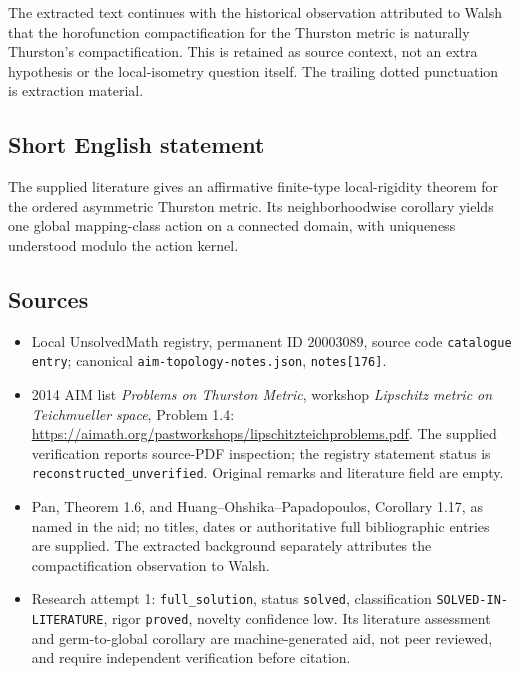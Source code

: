 \documentclass[11pt]{article}
\begin{document}
The extracted text continues with the historical observation attributed to Walsh that the horofunction compactification for the Thurston metric is naturally Thurston's compactification. This is retained as source context, not an extra hypothesis or the local-isometry question itself. The trailing dotted punctuation is extraction material.
\subsection{Short English statement}
The supplied literature gives an affirmative finite-type local-rigidity theorem for the ordered asymmetric Thurston metric. Its neighborhoodwise corollary yields one global mapping-class action on a connected domain, with uniqueness understood modulo the action kernel.
\subsection{Sources}
\begin{itemize}
\item Local UnsolvedMath registry, permanent ID $20003089$, source code \texttt{catalogue entry}; canonical \texttt{aim-topology-notes.json}, \texttt{notes[176]}.
\item 2014 AIM list \emph{Problems on Thurston Metric}, workshop \emph{Lipschitz metric on Teichmueller space}, Problem 1.4: \url{https://aimath.org/pastworkshops/lipschitzteichproblems.pdf}. The supplied verification reports source-PDF inspection; the registry statement status is \texttt{reconstructed\_unverified}. Original remarks and literature field are empty.
\item Pan, Theorem 1.6, and Huang--Ohshika--Papadopoulos, Corollary 1.17, as named in the aid; no titles, dates or authoritative full bibliographic entries are supplied. The extracted background separately attributes the compactification observation to Walsh.
\item Research attempt 1: \texttt{full\_solution}, status \texttt{solved}, classification \texttt{SOLVED-IN-LITERATURE}, rigor \texttt{proved}, novelty confidence low. Its literature assessment and germ-to-global corollary are machine-generated aid, not peer reviewed, and require independent verification before citation.
\end{itemize}
\end{document}
